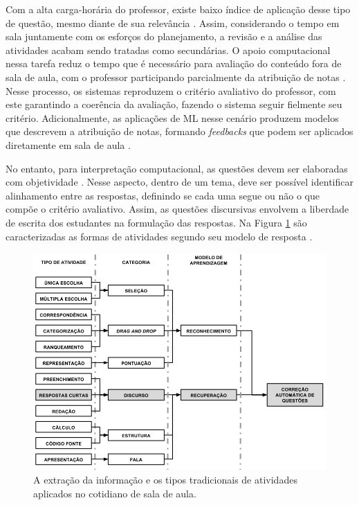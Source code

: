 Com a alta carga-horária do professor, existe baixo índice de aplicação desse tipo de questão, mesmo diante de sua relevância \cite{bilgin2017}. Assim, considerando o tempo em sala juntamente com os esforços do planejamento, a revisão e a análise das atividades acabam sendo tratadas como secundárias. O apoio computacional nessa tarefa reduz o tempo que é necessário para avaliação do conteúdo fora de sala de aula, com o professor participando parcialmente da atribuição de notas \cite{ming2005}. Nesse processo, os sistemas reproduzem o critério avaliativo do professor, com este garantindo a coerência da avaliação, fazendo o sistema seguir fielmente seu critério. Adicionalmente, as aplicações de ML nesse cenário produzem modelos que descrevem a atribuição de notas, formando \textit{feedbacks} que podem ser aplicados diretamente em sala de aula \cite{butcher2010, bernius2022}. 

No entanto, para interpretação computacional, as questões devem ser elaboradas com objetividade \cite{bailey2008}. Nesse aspecto, dentro de um tema, deve ser possível identificar alinhamento entre as respostas, definindo se cada uma segue ou não o que compõe o critério avaliativo. Assim, as questões discursivas \cite{bezerra2008} envolvem a liberdade de escrita dos estudantes na formulação das respostas. Na Figura \ref{fig-atividades} são caracterizadas as formas de atividades segundo seu modelo de resposta \cite{spalenza2017}.

\begin{figure}[!h]
\centering
\includegraphics[width=\textwidth]{figuras/tiposAtividade}
\caption{A extração da informação e os tipos tradicionais de atividades aplicados no cotidiano de sala de aula.}
\label{fig-atividades}
\end{figure}

